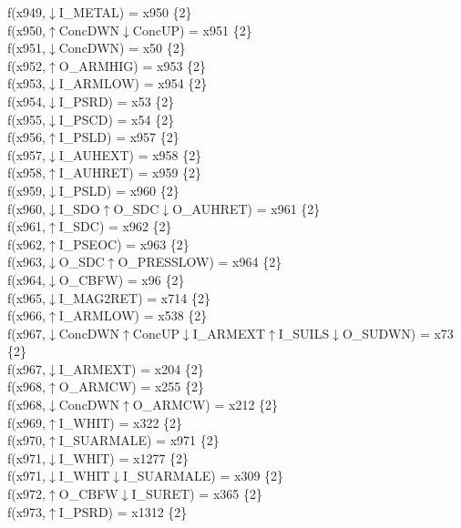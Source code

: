 f(x949,$\downarrow$I\_METAL) = x950 \{2\} \\  
f(x950,$\uparrow$ConcDWN$\downarrow$ConcUP) = x951 \{2\} \\  
f(x951,$\downarrow$ConcDWN) = x50 \{2\} \\  
f(x952,$\uparrow$O\_ARMHIG) = x953 \{2\} \\  
f(x953,$\downarrow$I\_ARMLOW) = x954 \{2\} \\  
f(x954,$\downarrow$I\_PSRD) = x53 \{2\} \\  
f(x955,$\downarrow$I\_PSCD) = x54 \{2\} \\  
f(x956,$\uparrow$I\_PSLD) = x957 \{2\} \\  
f(x957,$\downarrow$I\_AUHEXT) = x958 \{2\} \\  
f(x958,$\uparrow$I\_AUHRET) = x959 \{2\} \\  
f(x959,$\downarrow$I\_PSLD) = x960 \{2\} \\  
f(x960,$\downarrow$I\_SDO$\uparrow$O\_SDC$\downarrow$O\_AUHRET) = x961 \{2\} \\  
f(x961,$\uparrow$I\_SDC) = x962 \{2\} \\  
f(x962,$\uparrow$I\_PSEOC) = x963 \{2\} \\  
f(x963,$\downarrow$O\_SDC$\uparrow$O\_PRESSLOW) = x964 \{2\} \\  
f(x964,$\downarrow$O\_CBFW) = x96 \{2\} \\  
f(x965,$\downarrow$I\_MAG2RET) = x714 \{2\} \\  
f(x966,$\uparrow$I\_ARMLOW) = x538 \{2\} \\  
f(x967,$\downarrow$ConcDWN$\uparrow$ConcUP$\downarrow$I\_ARMEXT$\uparrow$I\_SUILS$\downarrow$O\_SUDWN) = x73 \{2\} \\  
f(x967,$\downarrow$I\_ARMEXT) = x204 \{2\} \\  
f(x968,$\uparrow$O\_ARMCW) = x255 \{2\} \\  
f(x968,$\downarrow$ConcDWN$\uparrow$O\_ARMCW) = x212 \{2\} \\  
f(x969,$\uparrow$I\_WHIT) = x322 \{2\} \\  
f(x970,$\uparrow$I\_SUARMALE) = x971 \{2\} \\  
f(x971,$\downarrow$I\_WHIT) = x1277 \{2\} \\  
f(x971,$\downarrow$I\_WHIT$\downarrow$I\_SUARMALE) = x309 \{2\} \\  
f(x972,$\uparrow$O\_CBFW$\downarrow$I\_SURET) = x365 \{2\} \\  
f(x973,$\uparrow$I\_PSRD) = x1312 \{2\} \\  

